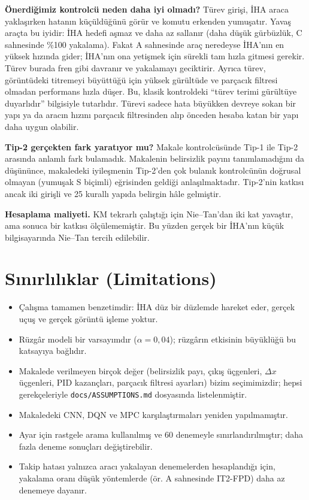 \documentclass[conference,a4paper]{IEEEtran}
\begin{document}
\textbf{Önerdiğimiz kontrolcü neden daha iyi olmadı?} Türev girişi, İHA araca yaklaşırken hatanın küçüldüğünü görür ve komutu erkenden yumuşatır. Yavaş araçta bu iyidir: İHA hedefi aşmaz ve daha az sallanır (daha düşük gürbüzlük, C sahnesinde \%100 yakalama). Fakat A sahnesinde araç neredeyse İHA'nın en yüksek hızında gider; İHA'nın ona yetişmek için sürekli tam hızla gitmesi gerekir. Türev burada fren gibi davranır ve yakalamayı geciktirir. Ayrıca türev, görüntüdeki titremeyi büyüttüğü için yüksek gürültüde ve parçacık filtresi olmadan performans hızla düşer. Bu, klasik kontroldeki ``türev terimi gürültüye duyarlıdır'' bilgisiyle tutarlıdır. Türevi sadece hata büyükken devreye sokan bir yapı ya da aracın hızını parçacık filtresinden alıp önceden hesaba katan bir yapı daha uygun olabilir.

\textbf{Tip-2 gerçekten fark yaratıyor mu?} Makale kontrolcüsünde Tip-1 ile Tip-2 arasında anlamlı fark bulamadık. Makalenin belirsizlik payını tanımlamadığını da düşününce, makaledeki iyileşmenin Tip-2'den çok bulanık kontrolcünün doğrusal olmayan (yumuşak S biçimli) eğrisinden geldiği anlaşılmaktadır. Tip-2'nin katkısı ancak iki girişli ve 25 kurallı yapıda belirgin hâle gelmiştir.

\textbf{Hesaplama maliyeti.} KM tekrarlı çalıştığı için Nie--Tan'dan iki kat yavaştır, ama sonuca bir katkısı ölçülememiştir. Bu yüzden gerçek bir İHA'nın küçük bilgisayarında Nie--Tan tercih edilebilir.

\section{Sınırlılıklar (Limitations)}
\begin{itemize}
\item Çalışma tamamen benzetimdir: İHA düz bir düzlemde hareket eder, gerçek uçuş ve gerçek görüntü işleme yoktur.
\item Rüzgâr modeli bir varsayımdır ($\alpha=0{,}04$); rüzgârın etkisinin büyüklüğü bu katsayıya bağlıdır.
\item Makalede verilmeyen birçok değer (belirsizlik payı, çıkış üçgenleri, $\Delta x$ üçgenleri, PID kazançları, parçacık filtresi ayarları) bizim seçimimizdir; hepsi gerekçeleriyle \texttt{docs/ASSUMPTIONS.md} dosyasında listelenmiştir.
\item Makaledeki CNN, DQN ve MPC karşılaştırmaları yeniden yapılmamıştır.
\item Ayar için rastgele arama kullanılmış ve 60 denemeyle sınırlandırılmıştır; daha fazla deneme sonuçları değiştirebilir.
\item Takip hatası yalnızca aracı yakalayan denemelerden hesaplandığı için, yakalama oranı düşük yöntemlerde (ör. A sahnesinde IT2-FPD) daha az denemeye dayanır.
\end{itemize}
\end{document}
